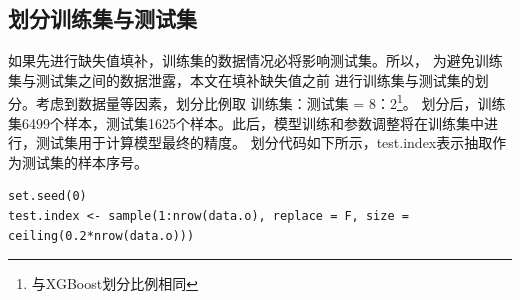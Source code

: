\documentclass[lang=cn,11pt,a4paper,cite=super]{elegantpaper}
\begin{document}
\subsection{划分训练集与测试集}\label{sec:huafen}
如果先进行缺失值填补，训练集的数据情况必将影响测试集。所以，
为避免训练集与测试集之间的数据泄露，本文在填补缺失值之前
进行训练集与测试集的划分。考虑到数据量等因素，划分比例取
训练集：测试集 = 8：2\footnote{与XGBoost划分比例相同}。
划分后，训练集6499个样本，测试集1625个样本。此后，模型训练和参数调整将在训练集中进行，测试集用于计算模型最终的精度。
划分代码如下所示，test.index表示抽取作为测试集的样本序号。
\begin{lstlisting}[style=R]
set.seed(0)
test.index <- sample(1:nrow(data.o), replace = F, size = ceiling(0.2*nrow(data.o))) 
\end{lstlisting}
\end{document}

